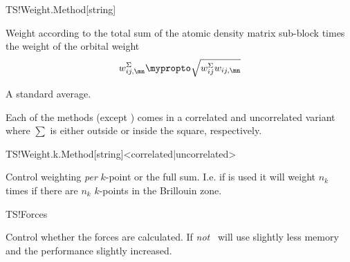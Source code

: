 \begin{fdfentry}{TS!Weight.Method}[string]
\begin{fdfoptions}
    
    Weight according to the total sum of the atomic density matrix
    sub-block times the weight of the orbital weight
    \begin{equation}
      w_{ij,\mn}^{\Sigma} \mypropto
      \sqrt{
          w_{ij}^{\Sigma} 
          w_{ij,\mn}
      }
    \end{equation}

    \option[mean]%
    
    A standard average.
    
  \end{fdfoptions}


  Each of the methods (except ) comes in a correlated and
  uncorrelated variant where $\sum$ is either outside or inside the
  square, respectively.

\end{fdfentry}

\begin{fdfentry}{TS!Weight.k.Method}[string]<correlated|uncorrelated>

  Control weighting \emph{per} $k$-point or the full sum. I.e. if
   is used it will weight $n_k$ times if there are
  $n_k$ $k$-points in the Brillouin zone.
  
\end{fdfentry}

\begin{fdflogicalT}{TS!Forces}
  
  Control whether the forces are calculated. If \emph{not} \tsiesta\
  will use slightly less memory and the performance slightly
  increased.

\end{fdflogicalT}

